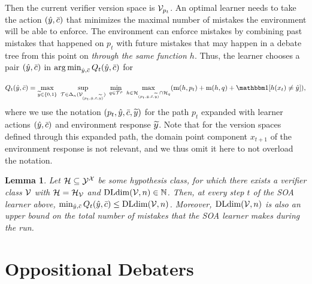 \documentclass[11pt,letterpaper]{article}
\newtheorem{lemma}[theorem]{Lemma}
\theoremstyle{definition}
\theoremstyle{plain}
\DeclareMathOperator*{\argmin}{arg\,min}
\begin{document}
Then the current verifier version space is ${\mathcal V}_{p_t}$. 
An optimal learner needs to take the action $({\hat{y}}, \bar{c})$ that minimizes the maximal number of mistakes the environment will be able to enforce. The environment can enforce mistakes by combining past mistakes that happened on $p_t$ with future mistakes that may happen in a debate tree from this point on \emph{through the same function $h$}.
Thus, the learner chooses a pair $({\hat{y}}, \bar{c})$ in $\argmin_{\hy, \sc}Q_t(\hy, \sc)$ for

\[
Q_t(\hy, \sc) = \max_{\vy\in\{0,1\}} ~\sup_{\T\in\Delta_n(\V_{(p_t,\hy, \sc, \vy)})} ~\min_{q\in\T^\rho} ~\max_{h\in \H_{(p_t,\hy, \sc, \vy)}\cap \H_q} (\mi(h, p_t) + \mi(h,q) +\indct[h(x_t) \neq \hy]),
\]
where we use the notation $(p_t,{\hat{y}}, \bar{c}, {\widetilde{y}})$ for the path $p_t$ expanded with learner actions $({\hat{y}}, \bar{c})$ and environment response ${\widetilde{y}}$. 
Note that for the version spaces defined through this expanded path, the domain point component $x_{t+1}$ of the  environment response is not relevant, and we thus omit it here to not overload the notation.

\begin{lemma}\label{lemma:cooperative_deterministic_upperbound}
 Let ${{\mathcal H}}\subseteq {\mathcal Y}^{\mathcal X}$ be some hypothesis class, for which there exists a verifier class ${\mathcal V}$ with ${{\mathcal H}} = {{\mathcal H}}_{\mathcal V}$ and $\mathrm{DLdim}({\mathcal V}, n) \in \mathbb{N}$. Then, at every step $t$ of the SOA learner above, $\min_{{\hat{y}},\bar{c}} Q_t({\hat{y}},\bar{c}) \leq \mathrm{DLdim}({\mathcal V}, n)$. 
  Moreover, $\mathrm{DLdim}({\mathcal V}, n)$ is also an upper bound on the total number of mistakes that the SOA learner makes during the run.
\end{lemma}





\section{Oppositional Debaters}
\label{sec:oppositional}
\end{document}
